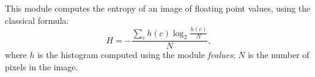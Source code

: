This module computes the entropy of an image of floating point values,
using the classical formula:
\[
 H = - \frac{\sum_{c} h(c) \log_2 \frac{h(c)}{N}}{N},
\]
where $h$ is the histogram computed using the module {\em fvalues};
$N$ is the number of pixels in the image.
